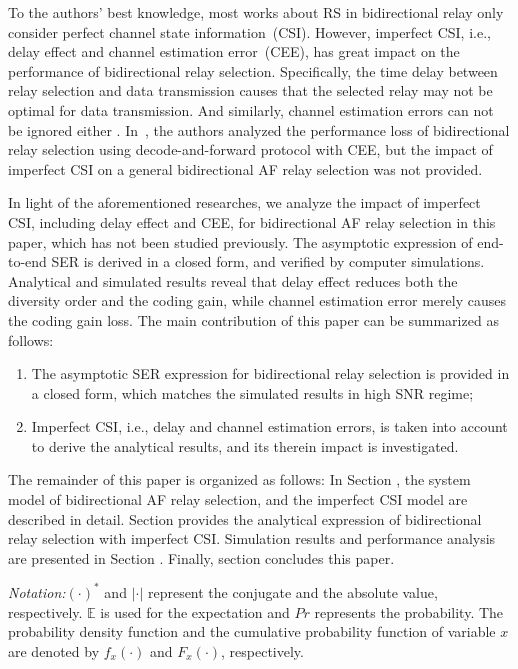 \documentclass[onecolumn,letterpaper,11pt,draftclsnofoot]{IEEEtran}
\begin{document}
To the authors' best knowledge, most works about RS in bidirectional
relay only consider perfect channel state information~(CSI).
However, imperfect CSI, i.e., delay effect and channel estimation
error~(CEE), has great impact on the performance of bidirectional
relay selection. Specifically, the time delay between relay
selection and data transmission causes that the selected relay may
not be optimal for data
transmission\cite{Torabi2010,Suraweera2010,Michalopoulos2010}. And
similarly, channel estimation errors can not be ignored either
\cite{Seyfi2010,Seung2009,Gedik2009,Ding2011}. In~\cite{Ding2011},
the authors analyzed the performance loss of bidirectional relay
selection using decode-and-forward protocol with CEE, but the impact
of imperfect CSI on a general bidirectional AF relay selection was
not provided.

In light of the aforementioned researches, we analyze the impact of
imperfect CSI, including delay effect and CEE, for bidirectional AF
relay selection in this paper, which has not been studied
previously. The asymptotic expression of end-to-end SER is derived
in a closed form, and verified by computer simulations. Analytical
and simulated results reveal that delay effect reduces both the
diversity order and the coding gain, while channel estimation error
merely causes the coding gain loss. The main contribution of this paper can be summarized as
follows:
\begin{enumerate}
  \item The asymptotic SER expression for bidirectional relay selection is provided in a closed form, which matches the simulated results in high SNR regime;
  \item Imperfect CSI, i.e., delay and channel estimation errors, is taken into account to derive the analytical results, and its therein impact is investigated.
\end{enumerate}

The remainder of this paper is organized as follows: In Section
\uppercase\expandafter{}, the system model of
bidirectional AF relay selection, and the imperfect CSI model are
described in detail. Section \uppercase\expandafter{}
provides the analytical expression of bidirectional relay selection
with imperfect CSI. Simulation results and performance analysis are
presented in Section \uppercase\expandafter{}.
Finally, section \uppercase\expandafter{} concludes
this paper.

\emph{Notation:}$\left(\cdot\right)^*$ and $\left|\cdot\right|$ represent the conjugate and the absolute value, respectively. $\mathbb{E}$ is used for the expectation and $Pr$ represents the probability. The probability density function and the cumulative probability function of variable $x$ are denoted by $f_x\left(\cdot\right)$ and $F_x\left(\cdot\right)$, respectively.
\end{document}
